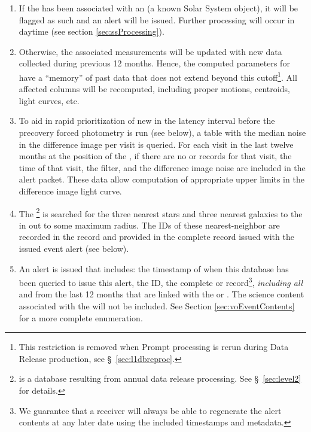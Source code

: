 \begin{enumerate}
\item If the \DIASource has been associated with an \SSObject (a known Solar System object), it will be flagged as such and an alert will be issued. Further processing will occur in daytime (see section \ref{sec:ssProcessing}).
\item Otherwise, the associated \DIAObject measurements will be updated with new data
collected during previous 12 months. Hence, the computed parameters for \DIAObjects have a ``memory'' of past data that does not extend beyond this cutoff\footnote{This restriction is removed when Prompt processing is
rerun during Data Release production, see \S~\ref{sec:l1dbreproc}.}. All affected columns will be recomputed, including proper motions, centroids, light curves, etc.
\item To aid in rapid prioritization of new \DIAObjects in the latency interval before the precovery forced photometry is run (see below), a table with the median noise in the difference image per visit is queried.  For each visit in the last twelve months at the position of the \DIAObject, if there are no \DIASource or \DIAForcedSource records for that visit,  the time of that visit, the filter, and the difference image noise are included in the alert packet. These data allow computation of appropriate upper limits in the difference image light curve.
\item The \DR\footnote{\DR is a database resulting from annual data release processing. See \S~\ref{sec:level2} for details.} is searched for the three nearest stars and three nearest galaxies to the \DIAObject in \Objects{} out to some maximum radius. The IDs of these nearest-neighbor \Objects are recorded in the \DIAObject record and provided in the complete \DIAObject record issued with the issued event alert (see below).
\item An alert is issued that includes: the timestamp of when this database has been queried to issue this alert, the \DIASource ID, the complete \SSObject or \DIAObject record\footnote{We guarantee that a receiver will always be able to regenerate the alert contents at any later date using the included timestamps and metadata.}, \emph{including all} \DIASources and \DIAForcedSources from the last 12 months that are linked with the \SSObject or \DIAObject. The science content associated with the \DR \Objects will not be included. See Section \ref{sec:voEventContents} for a more complete enumeration.

\end{enumerate}
